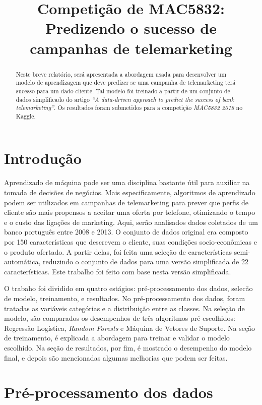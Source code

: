 \documentclass[12pt]{article}
\title{Competição de MAC5832: Predizendo o sucesso de campanhas de telemarketing}
\date{}
\begin{document}
\maketitle

\begin{abstract}
    Neste breve relatório, será apresentada a abordagem usada para desenvolver um modelo de aprendizagem que deve predizer se uma campanha de telemarketing terá sucesso para um dado cliente. Tal modelo foi treinado a partir de um conjunto de dados simplificado do artigo \emph{``A  data-driven  approach  to  predict  the  success  of  bank  telemarketing''}. Os resultados foram submetidos para a competição \emph{MAC5832 2018} no Kaggle.
\end{abstract}

\section{Introdução}

Aprendizado de máquina pode ser uma disciplina bastante útil para auxiliar na tomada de decisões de negócios. Mais especificamente, algoritmos de aprendizado podem ser utilizados em campanhas de telemarketing para prever que perfis de cliente são mais propensos a aceitar uma oferta por telefone, otimizando o tempo e o custo das ligações de marketing. Aqui, serão analisados dados coletados de um banco português entre 2008 e 2013. O conjunto de dados original era composto por 150 características que descrevem o cliente, suas condições socio-econômicas e o produto ofertado. A partir delas, foi feita uma seleção de características semi-automática, reduzindo o conjunto de dados para uma versão simplificada de 22 características. Este trabalho foi feito com base nesta versão simplificada.

O trabaho foi dividido em quatro estágios: pré-processamento dos dados, selecão de modelo, treinamento, e resultados. No pré-processamento dos dados, foram tratadas as variáveis categórias e a distribuição entre as classes. Na seleção de modelo, são comparados os desempenhos de três algoritmos pré-escolhidos: Regressão Logística, \emph{Random Forests} e Máquina de Vetores de Suporte. Na seção de treinamento, é explicada a abordagem para treinar e validar o modelo escolhido. Na seção de resultados, por fim, é mostrado o desempenho do modelo final, e depois são mencionadas algumas melhorias que podem ser feitas.

\section{Pré-processamento dos dados}
\end{document}
